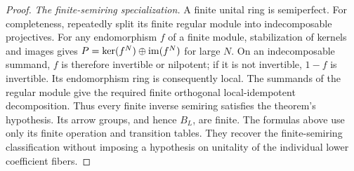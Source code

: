 \begin{proof}
\emph{The finite-semiring specialization.}
A finite unital ring is semiperfect. For completeness, repeatedly split
its finite regular module into indecomposable projectives. For any
endomorphism $f$ of a finite module, stabilization of kernels and images
gives $P=\ker(f^N)\oplus\operatorname{im}(f^N)$ for large $N$. On an
indecomposable summand, $f$ is therefore invertible or nilpotent;
if it is not invertible, $1-f$ is invertible. Its endomorphism ring
is consequently local. The summands of the regular module give the
required finite orthogonal local-idempotent decomposition.
Thus every finite inverse semiring satisfies the theorem's hypothesis.
Its arrow groups, and hence $B_L$, are finite. The formulas above use
only its finite operation and transition tables. They recover the
finite-semiring classification without imposing a hypothesis on
unitality of the individual lower coefficient fibers.
\end{proof}


